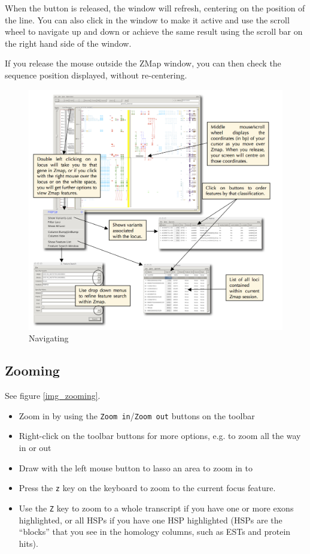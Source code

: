 \documentclass[letterpaper]{article}
\begin{document}
When the button is released, the window will refresh, centering on the position of the line. You can also click in the window to make it active and use the scroll wheel to navigate up and down or achieve the same result using the scroll bar on the right hand side of the window.

If you release the mouse outside the ZMap window, you can then check the sequence position displayed, without re-centering.

\begin{figure}
\centering
\color[rgb]{0.30980393,0.5058824,0.7411765}
\includegraphics[width=15.231cm]{images/navigating.png}
\caption{Navigating}
\label{img_navigating}
\end{figure}


\subsection{Zooming} \label{sec_zooming}
See figure \ref{img_zooming}.

\begin{itemize}
\item Zoom in by using the \lstinline{Zoom in}/\lstinline{Zoom out} buttons on the toolbar
\item Right-click on the toolbar buttons for more options, e.g. to zoom all the way in or out
\item Draw with the left mouse button to lasso an area to zoom in to
\item Press the \lstinline{z} key on the keyboard to zoom to the current focus feature.
\item Use the \lstinline{Z} key to zoom to a whole transcript if you have one or more exons highlighted, or all HSPs if you have one HSP highlighted (HSPs are the ``blocks'' that you see in the homology columns, such as ESTs and protein hits). 
\end{itemize}
\end{document}
